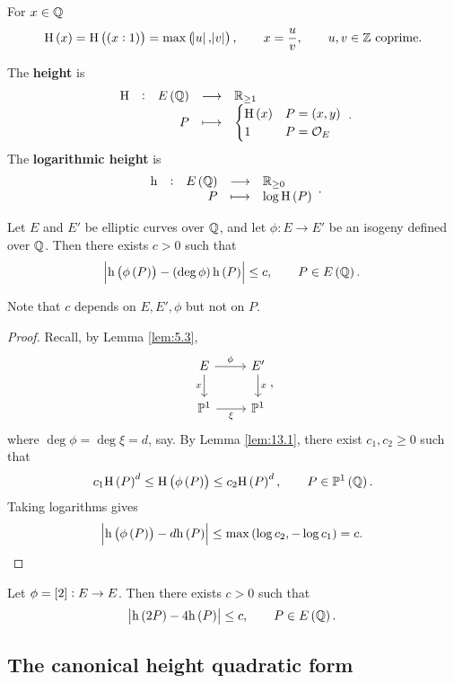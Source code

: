 \pagebreak

\begin{notation*}
For $ x \in \mathbb{Q} $
$$ \H\br{x} = \H\br{\br{x : 1}} = \max\br{\abs{u}, \abs{v}}, \qquad x = \dfrac{u}{v}, \qquad u, v \in \ZZ \ \text{coprime}. $$
\end{notation*}

\begin{definition*}
The \textbf{height} is
$$ \function[\H]{E\br{\QQ}}{\RR_{\ge 1}}{P}{
\begin{cases}
\H\br{x} & P = \br{x, y} \\
1 & P = \OOO_E
\end{cases}
}. $$
The \textbf{logarithmic height} is
$$ \function[\h]{E\br{\QQ}}{\RR_{\ge 0}}{P}{\log \H\br{P}}. $$
\end{definition*}

\begin{lemma}
\label{lem:13.2}
Let $ E $ and $ E' $ be elliptic curves over $ \mathbb{Q} $, and let $ \phi : E \to E' $ be an isogeny defined over $ \mathbb{Q} $. Then there exists $ c > 0 $ such that
$$ \abs{\h\br{\phi\br{P}} - \br{\deg \phi}\h\br{P}} \le c, \qquad P \in E\br{\QQ}. $$
\end{lemma}

Note that $ c $ depends on $ E, E', \phi $ but not on $ P $.

\begin{proof}
Recall, by Lemma \ref{lem:5.3},
$$
\begin{tikzcd}
E \arrow{r}{\phi} \arrow{d}[swap]{x} & E' \arrow{d}{x} \\
\PP^1 \arrow{r}[swap]{\xi} & \PP^1
\end{tikzcd},
$$
where $ \deg \phi = \deg \xi = d $, say. By Lemma \ref{lem:13.1}, there exist $ c_1, c_2 \ge 0 $ such that
$$ c_1\H\br{P}^d \le \H\br{\phi\br{P}} \le c_2\H\br{P}^d, \qquad P \in \PP^1\br{\QQ}. $$
Taking logarithms gives
$$ \abs{\h\br{\phi\br{P}} - d\h\br{P}} \le \max\br{\log c_2, -\log c_1} = c. $$
\end{proof}

\begin{example*}
Let $ \phi = \sbr{2} : E \to E $. Then there exists $ c > 0 $ such that
\begin{equation}
\label{eq:15}
\abs{\h\br{2P} - 4\h\br{P}} \le c, \qquad P \in E\br{\QQ}.
\end{equation}
\end{example*}

\subsection{The canonical height quadratic form}

